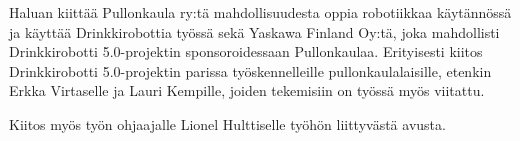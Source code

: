 Haluan kiittää Pullonkaula ry:tä mahdollisuudesta oppia robotiikkaa käytännössä ja käyttää Drinkkirobottia työssä sekä Yaskawa Finland Oy:tä, joka mahdollisti Drinkkirobotti 5.0\hyp{}projektin sponsoroidessaan Pullonkaulaa. Erityisesti kiitos Drinkkirobotti 5.0\hyp{}projektin parissa työskennelleille pullonkaulalaisille, etenkin Erkka Virtaselle ja Lauri Kempille, joiden tekemisiin on työssä myös viitattu.

Kiitos myös työn ohjaajalle Lionel Hulttiselle työhön liittyvästä avusta.
